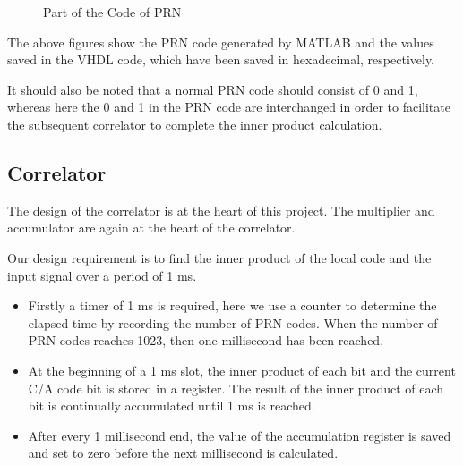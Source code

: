 \begin{figure}[!h]
    \centering
    \caption{Part of the Code of PRN }
    \label{fig:prn2_code}
\end{figure}

The above figures show the PRN  code generated by MATLAB and the values saved in the VHDL code, which have been saved in hexadecimal, respectively.

It should also be noted that a normal PRN code should consist of 0 and 1, whereas here the 0 and 1 in the PRN code are interchanged in order to facilitate the subsequent correlator to complete the inner product calculation.

\subsection{Correlator}
The design of the correlator is at the heart of this project. The multiplier and accumulator are again at the heart of the correlator.

Our design requirement is to find the inner product of the local code and the input signal over a period of 1 ms. 
\begin{itemize}
    \item Firstly a timer of 1 ms is required, here we use a counter to determine the elapsed time by recording the number of PRN codes. When the number of PRN codes reaches 1023, then one millisecond has been reached.
    \item At the beginning of a 1 ms slot, the inner product of each bit and the current C/A code bit is stored in a register. The result of the inner product of each bit is continually accumulated until 1 ms is reached.
    \item After every 1 millisecond end, the value of the accumulation register is saved and set to zero before the next millisecond is calculated.
\end{itemize}

